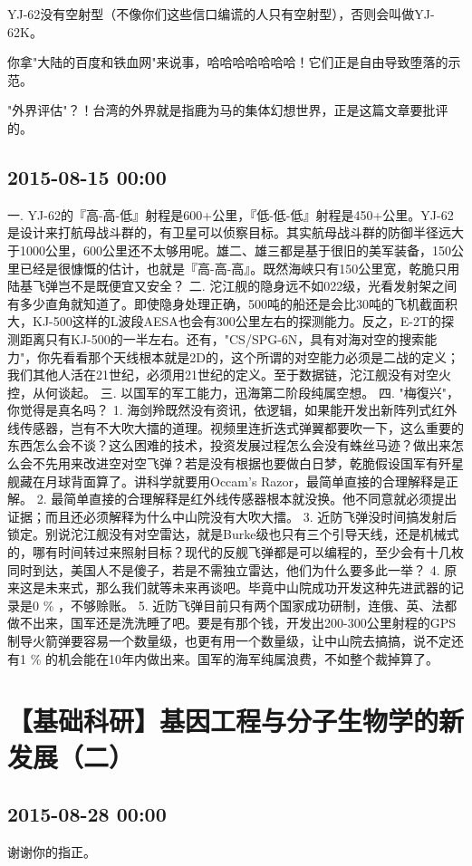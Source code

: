 \documentclass[twocolumn]{ctexart}
\begin{document}
YJ-62没有空射型（不像你们这些信口编谎的人只有空射型），否则会叫做YJ-62K。

你拿"大陆的百度和铁血网"来说事，哈哈哈哈哈哈哈！它们正是自由导致堕落的示范。

"外界评估"？！台湾的外界就是指鹿为马的集体幻想世界，正是这篇文章要批评的。\subsection*{2015-08-15 00:00}
一. YJ-62的『高-高-低』射程是600+公里，『低-低-低』射程是450+公里。YJ-62是设计来打航母战斗群的，有卫星可以侦察目标。其实航母战斗群的防御半径远大于1000公里，600公里还不太够用呢。雄二、雄三都是基于很旧的美军装备，150公里已经是很慷慨的估计，也就是『高-高-高』。既然海峡只有150公里宽，乾脆只用陆基飞弹岂不是既便宜又安全？
二. 沱江舰的隐身远不如022级，光看发射架之间有多少直角就知道了。即使隐身处理正确，500吨的船还是会比30吨的飞机截面积大，KJ-500这样的L波段AESA也会有300公里左右的探测能力。反之，E-2T的探测距离只有KJ-500的一半左右。还有，"CS/SPG-6N，具有对海对空的搜索能力"，你先看看那个天线根本就是2D的，这个所谓的对空能力必须是二战的定义；我们其他人活在21世纪，必须用21世纪的定义。至于数据链，沱江舰没有对空火控，从何谈起。
三. 以国军的军工能力，迅海第二阶段纯属空想。
四. "梅復兴"，你觉得是真名吗？
1. 海剑羚既然没有资讯，依逻辑，如果能开发出新阵列式红外线传感器，岂有不大吹大擂的道理。视频里连折迭式弹翼都要吹一下，这么重要的东西怎么会不谈？这么困难的技术，投资发展过程怎么会没有蛛丝马迹？做出来怎么会不先用来改进空对空飞弹？若是没有根据也要做白日梦，乾脆假设国军有歼星舰藏在月球背面算了。讲科学就要用Occam's Razor，最简单直接的合理解释是正解。
2. 最简单直接的合理解释是红外线传感器根本就没换。他不同意就必须提出证据；而且还必须解释为什么中山院没有大吹大擂。
3. 近防飞弹没时间搞发射后锁定。别说沱江舰没有对空雷达，就是Burke级也只有三个引导天线，还是机械式的，哪有时间转过来照射目标？现代的反舰飞弹都是可以编程的，至少会有十几枚同时到达，美国人不是傻子，若是不需独立雷达，他们为什么要多此一举？
4. 原来这是未来式，那么我们就等未来再谈吧。毕竟中山院成功开发这种先进武器的记录是0 \% ，不够赊账。
5. 近防飞弹目前只有两个国家成功研制，连俄、英、法都做不出来，国军还是洗洗睡了吧。要是有那个钱，开发出200-300公里射程的GPS制导火箭弹要容易一个数量级，也更有用一个数量级，让中山院去搞搞，说不定还有1 \% 的机会能在10年内做出来。国军的海军纯属浪费，不如整个裁掉算了。
\section*{【基础科研】基因工程与分子生物学的新发展（二）}
\subsection*{2015-08-28 00:00}
谢谢你的指正。
\end{document}

